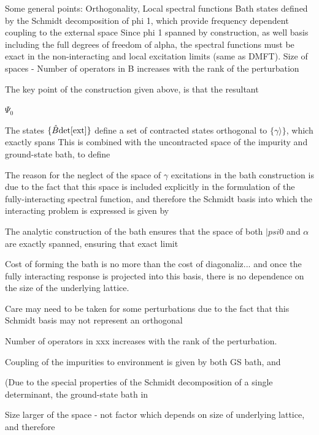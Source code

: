 \documentclass[aps,showpacs,twocolumn,nobibnotes]{revtex4}
\begin{document}
Some general points:
    Orthogonality,
    Local spectral functions
    Bath states defined by the Schmidt decomposition of phi 1, which provide frequency dependent coupling to the external space
    Since phi 1 spanned by construction, as well basis including the full degrees of freedom of alpha, the spectral functions must be exact in the non-interacting and local excitation limits (same as DMFT).
    Size of spaces - Number of operators in B increases with the rank of the perturbation


The key point of the construction given above, is that the resultant


$\Psi_0$

The 
states $\{ {\hat B} \rm{det[ext]} \}$ define a set of contracted states orthogonal to $\{ \gamma \rangle \}$, which exactly spans
This is combined with the uncontracted space
of the impurity and ground-state bath, to define

The reason for the neglect of the space of $\gamma$ excitations in the bath construction is due to the fact that this space is included explicitly in the formulation of the fully-interacting spectral function,
and therefore the Schmidt basis into which the interacting problem is expressed is given by 

The analytic construction of the bath ensures that the space of both $|psi0$ and $\alpha$ are exactly spanned, ensuring that exact limit

Cost of forming the bath is no more than the cost of diagonaliz... and once the fully interacting response is projected into this basis, there is no dependence on the size of the underlying lattice.

Care may need to be taken for some perturbations due to the fact that this Schmidt basis may not represent an orthogonal

Number of operators in xxx increases with the rank of the perturbation.

Coupling of the impurities to environment is given by both GS bath, and 




(Due to the special properties of the Schmidt decomposition of a single determinant, the ground-state bath in 

Size larger of the space - not factor which depends on size of underlying lattice, and therefore 
\end{document}
